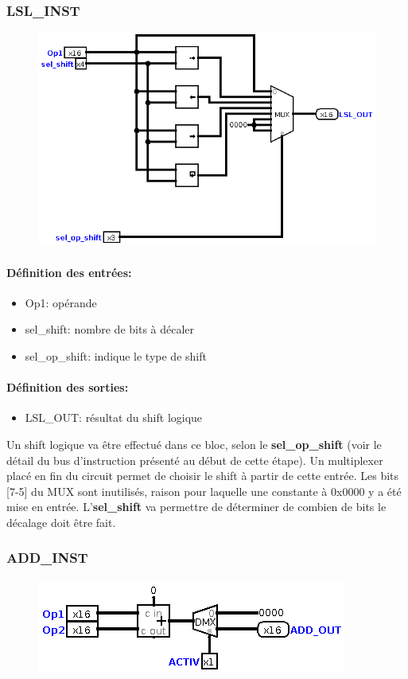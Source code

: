\documentclass[a4paper]{article} %
\begin{document}
\subsubsection{LSL\_INST}
\begin{figure}[H]
    \centering
    \includegraphics[width=.8\textwidth]{src/LSL_INST.png}
    \label{fig:lsl_inst_pic}
\end{figure}
\paragraph{Définition des entrées:}
\begin{itemize}
    \item     Op1: opérande
    \item     sel\_shift: nombre de bits à décaler
    \item     sel\_op\_shift: indique le type de shift
\end{itemize}

\paragraph{Définition des sorties:}
\begin{itemize}
    \item     LSL\_OUT: résultat du shift logique
\end{itemize}
\medskip
Un shift logique va être effectué dans ce bloc, selon le \textbf{sel\_op\_shift} (voir le détail du bus d'instruction présenté au début de cette étape). Un multiplexer placé en fin du circuit permet de choisir le shift à partir de cette entrée. Les bits [7-5] du MUX sont inutilisés, raison pour laquelle une constante à 0x0000 y a été mise en entrée. L'\textbf{sel\_shift} va permettre de déterminer de combien de bits le décalage doit être fait.

\subsubsection{ADD\_INST}
\begin{figure}[H]
    \centering
    \includegraphics[width=.8\textwidth]{src/ADD_INST.png}
    \label{fig:add_inst_pic}
\end{figure}
\end{document}

